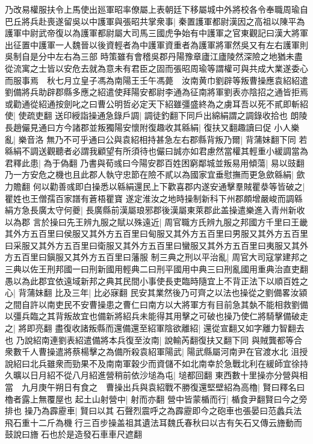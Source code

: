 乃改易權服扶令上馬使出廵軍昭率僚屬上表朝廷下移屬城中外將校各令奉職周瑜自巴丘將兵赴喪遂留吳以中護軍與張昭共掌衆事|{
	秦置護軍都尉漢因之高祖以陳平為護軍中尉武帝復以為護軍都尉屬大司馬三國虎争始有中護軍之官東觀記曰漢大將軍出征置中護軍一人魏晉以後資輕者為中護軍資重者為護軍將軍然吳又有左右護軍則吳制自是分中左右為三部}
時策雖有會稽吳郡丹陽豫章廬江廬陵然深險之地猶未盡從流寓之士皆以安危去就為意未有君臣之固而張昭周瑜等謂權可與共成大業遂委心而服事焉　秋七月立皇子馮為南陽王壬午馮薨　汝南黄巾劉辟等叛曹操應袁紹紹遣劉備將兵助辟郡縣多應之紹遣使拜陽安都尉李通為征南將軍劉表亦陰招之通皆拒焉或勸通從紹通按劍叱之曰曹公明哲必定天下紹雖彊盛終為之虜耳吾以死不貳即斬紹使|{
	使疏吏翻}
送印綬詣操通急錄戶調|{
	調徒釣翻下同戶出綿絹謂之調錄收拾也}
朗陵長趙儼見通曰方今諸郡並叛獨陽安懷附復趣收其緜絹|{
	復扶又翻趣讀曰促}
小人樂亂|{
	樂音洛}
無乃不可乎通曰公與袁紹相持甚急左右郡縣背叛乃爾|{
	背蒲妹翻下同}
若緜絹不調送觀聽者必謂我顧望有所須待也儼曰誠亦如君慮然當權其輕重小緩調當為君釋此患|{
	為于偽翻}
乃書與荀彧曰今陽安郡百姓困窮鄰城並叛易用傾蕩|{
	易以豉翻}
乃一方安危之機也且此郡人執守忠節在險不貳以為國家宜垂慰撫而更急歛緜絹|{
	歛力贍翻}
何以勸善彧即白操悉以緜絹還民上下歡喜郡内遂安通擊羣賊瞿㳟等皆破之|{
	瞿姓也王僧孺百家譜有蒼梧瞿寶}
遂定淮汝之地時操制新科下州郡頗增嚴峻而調緜絹方急長廣太守何夔|{
	長廣縣前漢屬琅邪郡後漢屬東萊郡此盖操遣樂進入青州新收以為郡}
言於操曰先王辨九服之賦以殊遠近|{
	周官職方氏辨九服之邦國方千里曰王畿其外方五百里曰侯服又其外方五百里曰甸服又其外方五百里曰男服又其外方五百里曰采服又其外方五百里曰衛服又其外方五百里曰蠻服又其外方五百里曰夷服又其外方五百里曰鎭服又其外方五百里曰藩服}
制三典之刑以平治亂|{
	周官大司寇掌建邦之三典以佐王刑邦國一曰刑新國用輕典二曰刑平國用中典三曰刑亂國用重典治直吏翻}
愚以為此郡宜依遠域新邦之典其民間小事使長吏臨時隨宜上不背正法下以順百姓之心|{
	背蒲妹翻}
比及三年|{
	比必寐翻}
民安其業然後乃可齊之以法也操從之劉備畧汝潁之間自許以南吏民不安曹操患之曹仁曰南方以大將軍方有目前急其埶不能相救劉備以彊兵臨之其背叛故宜也備新將紹兵未能得其用擊之可破也操乃使仁將騎擊備破走之|{
	將即亮翻}
盡復收諸叛縣而還備還至紹軍陰欲離紹|{
	還從宣翻又如字離力智翻去也}
乃說紹南連劉表紹遣備將本兵復至汝南|{
	說輸芮翻復扶又翻下同}
與賊龔都等合衆數千人曹操遣將蔡楊擊之為備所殺袁紹軍陽武|{
	陽武縣屬河南尹在官渡水北}
沮授說紹曰北兵雖衆而勁果不及南南軍穀少而資儲不如北南幸於急戰北利在緩師宜徐持久曠以日月紹不從八月紹進營稍前依沙塠為屯|{
	塠都回翻}
東西數十里操亦分營與相當　九月庚午朔日有食之　曹操出兵與袁紹戰不勝復還堅壁紹為高櫓|{
	賢曰釋名曰櫓者露上無覆屋也}
起土山射營中|{
	射而亦翻}
營中皆蒙楯而行|{
	楯食尹翻賢曰今之旁排也}
操乃為霹靂車|{
	賢曰以其石聲烈震呼之為霹靂即今之砲車也張晏曰范蠡兵法飛石重十二斤為機行三百步操盖祖其遺法耳魏氏春秋曰以古有矢石又傳云旝動而鼓說曰旝石也於是造發石車車尺遮翻}
